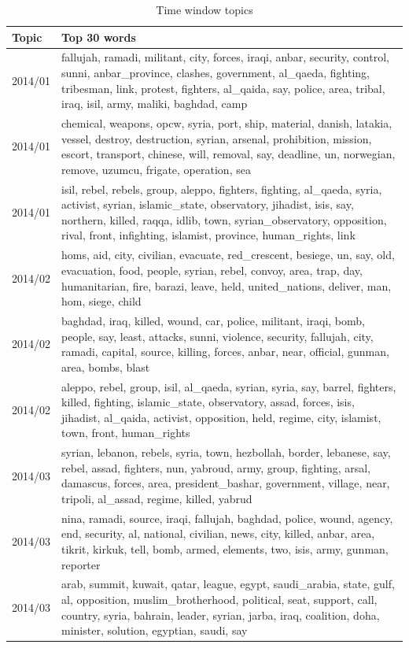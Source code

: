 \begin{table}[H]
{ \singlespacing
\small
\centering

\begin{tabularx}{\textwidth}{|l|X|}

 \hline
 Topic & Top 30 words   \\
 \hline\hline
 2014/01 &  fallujah, ramadi, militant, city, forces, iraqi, anbar, security, control, sunni, anbar\_province, clashes, government, al\_qaeda, fighting, tribesman, link, protest, fighters, al\_qaida, say, police, area, tribal, iraq, isil, army, maliki, baghdad, camp \\
 \hline
 2014/01 &  chemical, weapons, opcw, syria, port, ship, material, danish, latakia, vessel, destroy, destruction, syrian, arsenal, prohibition, mission, escort, transport, chinese, will, removal, say, deadline, un, norwegian, remove, uzumcu, frigate, operation, sea  \\
 \hline
 2014/01 &  isil, rebel, rebels, group, aleppo, fighters, fighting, al\_qaeda, syria, activist, syrian, islamic\_state, observatory, jihadist, isis, say, northern, killed, raqqa, idlib, town, syrian\_observatory, opposition, rival, front, infighting, islamist, province, human\_rights, link  \\
 \hline
 2014/02 &  homs, aid, city, civilian, evacuate, red\_crescent, besiege, un, say, old, evacuation, food, people, syrian, rebel, convoy, area, trap, day, humanitarian, fire, barazi, leave, held, united\_nations, deliver, man, hom, siege, child  \\
 \hline
 2014/02 &  baghdad, iraq, killed, wound, car, police, militant, iraqi, bomb, people, say, least, attacks, sunni, violence, security, fallujah, city, ramadi, capital, source, killing, forces, anbar, near, official, gunman, area, bombs, blast  \\
 \hline
 2014/02 &  aleppo, rebel, group, isil, al\_qaeda, syrian, syria, say, barrel, fighters, killed, fighting, islamic\_state, observatory, assad, forces, isis, jihadist, al\_qaida, activist, opposition, held, regime, city, islamist, town, front, human\_rights  \\
 \hline
 2014/03 &  syrian, lebanon, rebels, syria, town, hezbollah, border, lebanese, say, rebel, assad, fighters, nun, yabroud, army, group, fighting, arsal, damascus, forces, area, president\_bashar, government, village, near, tripoli, al\_assad, regime, killed, yabrud  \\
 \hline
 2014/03 &  nina, ramadi, source, iraqi, fallujah, baghdad, police, wound, agency, end, security, al, national, civilian, news, city, killed, anbar, area, tikrit, kirkuk, tell, bomb, armed, elements, two, isis, army, gunman, reporter
  \\
 \hline
 2014/03 & arab, summit, kuwait, qatar, league, egypt, saudi\_arabia, state, gulf, al, opposition, muslim\_brotherhood, political, seat, support, call, country, syria, bahrain, leader, syrian, jarba, iraq, coalition, doha, minister, solution, egyptian, saudi, say
 \\ [1ex] 
 \hline
 
\end{tabularx}
\caption{Time window topics} \label{tab:topicWords}
}
\end{table} 